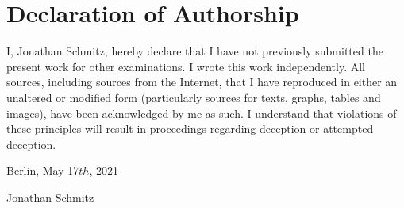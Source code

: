 
\section*{Declaration of Authorship}

I, Jonathan Schmitz, hereby declare that I have not previously submitted the present work for other examinations. I wrote this work independently. All sources, including sources from the Internet, that I have reproduced in either an unaltered or modified form (particularly sources for texts, graphs, tables and images), have been acknowledged by me as such. I understand that violations of these principles will result in proceedings regarding deception or attempted deception.
\vspace{1cm}

Berlin, May 17$th$, 2021 \vspace{0.3cm}

\underline{\hspace{5cm}} \medskip

Jonathan Schmitz
